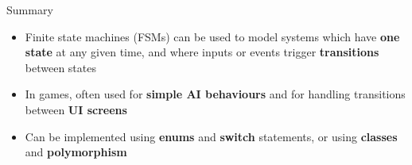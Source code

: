 \begin{frame}{Summary}
    \begin{itemize}
        \item Finite state machines (FSMs) can be used to model systems which have
            \textbf{one state} at any given time, and where inputs or events trigger \textbf{transitions} between states
        \item In games, often used for \textbf{simple AI behaviours} and for handling transitions between \textbf{UI screens}
        \item Can be implemented using \textbf{enums} and \textbf{switch} statements,
            or using \textbf{classes} and \textbf{polymorphism}
    \end{itemize}
\end{frame}
